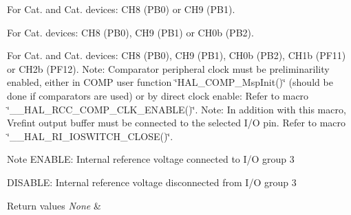 \begin{DoxyItemize}
\item For Cat. and Cat. devices\-: C\-H8 (P\-B0) or C\-H9 (P\-B1).
\item For Cat. devices\-: C\-H8 (P\-B0), C\-H9 (P\-B1) or C\-H0b (P\-B2).
\item For Cat. and Cat. devices\-: C\-H8 (P\-B0), C\-H9 (P\-B1), C\-H0b (P\-B2), C\-H1b (P\-F11) or C\-H2b (P\-F12). Note\-: Comparator peripheral clock must be preliminarility enabled, either in C\-O\-M\-P user function \char`\"{}\-H\-A\-L\-\_\-\-C\-O\-M\-P\-\_\-\-Msp\-Init()\char`\"{} (should be done if comparators are used) or by direct clock enable\-: Refer to macro \char`\"{}\-\_\-\-\_\-\-H\-A\-L\-\_\-\-R\-C\-C\-\_\-\-C\-O\-M\-P\-\_\-\-C\-L\-K\-\_\-\-E\-N\-A\-B\-L\-E()\char`\"{}. Note\-: In addition with this macro, Vrefint output buffer must be connected to the selected I/\-O pin. Refer to macro \char`\"{}\-\_\-\-\_\-\-H\-A\-L\-\_\-\-R\-I\-\_\-\-I\-O\-S\-W\-I\-T\-C\-H\-\_\-\-C\-L\-O\-S\-E()\char`\"{}. \begin{DoxyNote}{Note}
E\-N\-A\-B\-L\-E\-: Internal reference voltage connected to I/\-O group 3 

D\-I\-S\-A\-B\-L\-E\-: Internal reference voltage disconnected from I/\-O group 3 
\end{DoxyNote}

\begin{DoxyRetVals}{Return values}
{\em None} & \\
\hline
\end{DoxyRetVals}

\end{DoxyItemize}
